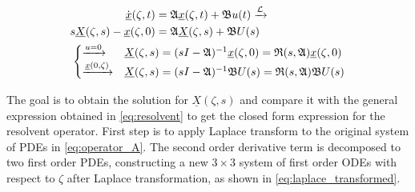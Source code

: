 \begin{equation} \label{eq:resolvent}
    \begin{aligned}
        \dot{\underline{x}}(\zeta, t) &= \mathfrak{A} \underline{x}(\zeta, t) + \mathfrak{B} u(t) \xrightarrow{\mathcal{L}}\\
        s \underline{X}(\zeta,s) - \underline{x}(\zeta,0) &= \mathfrak{A} \underline{X}(\zeta,s) + \mathfrak{B} U(s)\\
        &\hspace{-7.5em}\begin{cases}
            \xrightarrow{u = 0} &\underline{X}(\zeta,s) = (sI - \mathfrak{A})^{-1} \underline{x}(\zeta,0) = \mathfrak{R}(s, \mathfrak{A}) \underline{x}(\zeta,0)\\
            \xrightarrow{\underline{x}(0, \zeta)}& \underline{X}(\zeta,s) = (sI - \mathfrak{A})^{-1} \mathfrak{B} U(s) = \mathfrak{R}(s, \mathfrak{A}) \mathfrak{B} U(s)
        \end{cases}
    \end{aligned}
    \end{equation}
    
    The goal is to obtain the solution for $\underline{X}(\zeta, s)$ and compare it with the general expression obtained in \eqref{eq:resolvent} to get the closed form expression for the resolvent operator. First step is to apply Laplace transform to the original system of PDEs in \eqref{eq:operator_A}. The second order derivative term is decomposed to two first order PDEs, constructing a new $3 \times 3$ system of first order ODEs with respect to $\zeta$ after Laplace transformation, as shown in \eqref{eq:laplace_transformed}.
    
